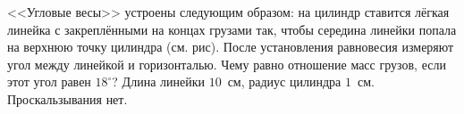 <<Угловые весы>> устроены следующим образом: на цилиндр ставится лёгкая линейка с закреплёнными на концах грузами так, чтобы середина линейки попала на верхнюю точку цилиндра (см. рис). После установления равновесия измеряют угол между линейкой и горизонталью. Чему равно отношение масс грузов, если этот угол равен $18^\circ$? Длина линейки $10$~см, радиус цилиндра $1$~см. Проскальзывания нет.
